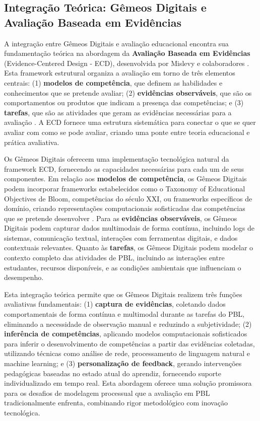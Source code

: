 \documentclass[english, spanish, brazilian]{RBIEarticle} %
\begin{document}
\subsection{Integração Teórica: Gêmeos Digitais e Avaliação Baseada em Evidências}

A integração entre Gêmeos Digitais e avaliação educacional encontra sua fundamentação teórica na abordagem da \textbf{Avaliação Baseada em Evidências} (Evidence-Centered Design - ECD), desenvolvida por Mislevy e colaboradores \parencite{Mislevy2003}. Esta framework estrutural organiza a avaliação em torno de três elementos centrais: (1) \textbf{modelos de competência}, que definem as habilidades e conhecimentos que se pretende avaliar; (2) \textbf{evidências observáveis}, que são os comportamentos ou produtos que indicam a presença das competências; e (3) \textbf{tarefas}, que são as atividades que geram as evidências necessárias para a avaliação \parencite{Pellegrino2001}. A ECD fornece uma estrutura sistemática para conectar o que se quer avaliar com como se pode avaliar, criando uma ponte entre teoria educacional e prática avaliativa.

Os Gêmeos Digitais oferecem uma implementação tecnológica natural da framework ECD, fornecendo as capacidades necessárias para cada um de seus componentes. Em relação aos \textbf{modelos de competência}, os Gêmeos Digitais podem incorporar frameworks estabelecidos como o Taxonomy of Educational Objectives de Bloom, competências do século XXI, ou frameworks específicos de domínio, criando representações computacionais sofisticadas das competências que se pretende desenvolver \parencite{Anderson2001}. Para as \textbf{evidências observáveis}, os Gêmeos Digitais podem capturar dados multimodais de forma contínua, incluindo logs de sistemas, comunicação textual, interações com ferramentas digitais, e dados contextuais relevantes. Quanto às \textbf{tarefas}, os Gêmeos Digitais podem modelar o contexto completo das atividades de PBL, incluindo as interações entre estudantes, recursos disponíveis, e as condições ambientais que influenciam o desempenho.

Esta integração teórica permite que os Gêmeos Digitais realizem três funções avaliativas fundamentais: (1) \textbf{captura de evidências}, coletando dados comportamentais de forma contínua e multimodal durante as tarefas do PBL, eliminando a necessidade de observação manual e reduzindo a subjetividade; (2) \textbf{inferência de competências}, aplicando modelos computacionais sofisticados para inferir o desenvolvimento de competências a partir das evidências coletadas, utilizando técnicas como análise de rede, processamento de linguagem natural e machine learning; e (3) \textbf{personalização de feedback}, gerando intervenções pedagógicas baseadas no estado atual do aprendiz, fornecendo suporte individualizado em tempo real. Esta abordagem oferece uma solução promissora para os desafios de modelagem processual que a avaliação em PBL tradicionalmente enfrenta, combinando rigor metodológico com inovação tecnológica.
\end{document}
